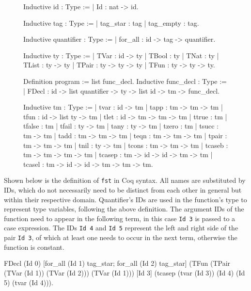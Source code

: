 \documentclass[fleqn, abstract=on]{scrreprt}
\newcommand{\coqinline}[1]{\texttt{#1}}
\begin{document}
\begin{figure}[H]
\begin{minipage}[t]{.5 \linewidth}
\begin{coqcode}
Inductive id : Type :=
| Id : nat -> id.

Inductive tag : Type :=
| tag_star  : tag
| tag_empty : tag.

Inductive quantifier : Type :=
| for_all : id -> tag -> quantifier.

Inductive ty : Type :=
| TVar  : id -> ty
| TBool : ty
| TNat  : ty
| TList : ty -> ty
| TPair : ty -> ty -> ty
| TFun  : ty -> ty -> ty.

Definition program := list func_decl.
Inductive func_decl : Type :=
| FDecl : id -> list quantifier -> ty -> list id -> tm -> func_decl.
\end{coqcode}
\end{minipage}
\begin{minipage}[t]{.5 \linewidth}
	\begin{coqcode}
Inductive tm : Type :=
  | tvar   : id -> tm
  | tapp   : tm -> tm -> tm
  | tfun   : id -> list ty -> tm
  | tlet   : id -> tm -> tm -> tm
  | ttrue  : tm
  | tfalse : tm
  | tfail  : ty -> tm
  | tany   : ty -> tm
  | tzero  : tm
  | tsucc  : tm -> tm
  | tadd   : tm -> tm -> tm
  | teqn   : tm -> tm -> tm
  | tpair  : tm -> tm -> tm
  | tnil   : ty -> tm
  | tcons  : tm -> tm -> tm
  | tcaseb : tm -> tm -> tm -> tm
  | tcasep : tm -> id -> id -> tm -> tm
  | tcasel : tm -> id -> id -> tm -> tm -> tm.
	\end{coqcode}
\end{minipage}
\end{figure}\noindent
Shown below is the definition of \texttt{fst} in Coq syntax. All names are substituted by IDs, which do not necessarily need to be distinct from each other in general but within their respective domain. Quantifier's IDs are used in the function's type to represent type variables, following the above definition. The argument IDs of the function need to appear in the following term, in this case \coqinline{Id 3} is passed to a case expression. The IDs \coqinline{Id 4} and \coqinline{Id 5} represent the left and right side of the pair \coqinline{Id 3}, of which at least one needs to occur in the next term, otherwise the function is constant.
\begin{coqcode}
FDecl (Id 0) 
      [for_all (Id 1) tag_star; for_all (Id 2) tag_star] 
      (TFun (TPair (TVar (Id 1)) (TVar (Id 2))) (TVar (Id 1)))
      [Id 3]
      (tcasep (tvar (Id 3)) (Id 4) (Id 5) (tvar (Id 4))).
\end{coqcode}
\end{document}
